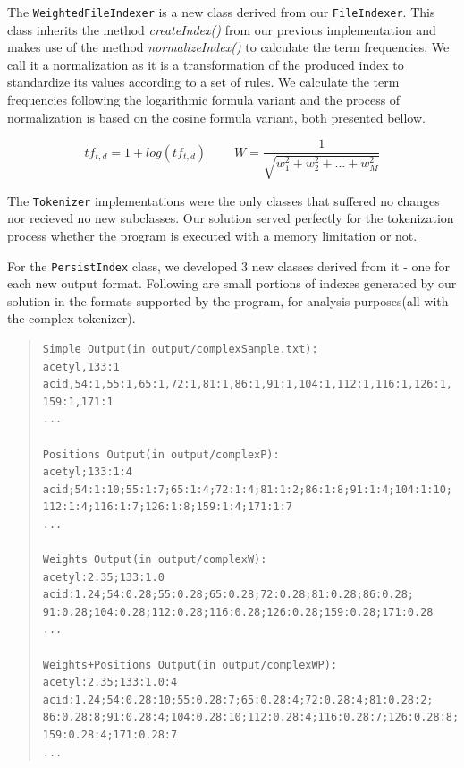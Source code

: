 \documentclass[12pt]{article}
\begin{document}
The \texttt{WeightedFileIndexer} is a new class derived from our 
\texttt{FileIndexer}.
This class inherits the method \textit{createIndex()} from our previous 
implementation and makes use of the method \textit{normalizeIndex()} to calculate 
the term frequencies. 
We call it a normalization as it is a transformation of the produced index to
standardize its values according to a set of rules.
We calculate the term frequencies following the logarithmic formula variant and 
the process of normalization is based on the cosine formula variant, both 
presented bellow.

\begin{equation*}
tf_{t,d} = 1 + log(tf_{t,d}) \>\>\>\>\>
\>\>\>\>\> W = \frac{1}{\sqrt{w_1^2 + w_2^2 + ... + w_M^2}}
\end{equation*}

The \texttt{Tokenizer} implementations were the only classes that suffered no
changes nor recieved no new subclasses. 
Our solution served perfectly for the tokenization process whether the program 
is executed with a memory limitation or not.

For the \texttt{PersistIndex} class, we developed 3 new classes derived from 
it - one for each new output format. 
Following are small portions of indexes generated by our solution in the formats
supported by the program, for analysis purposes(all with the complex tokenizer).

\begingroup
\addtolength\leftmargini{-0.4in}
\addtolength\baselineskip{-0.05in}
\begin{quote}
\begin{verbatim}
Simple Output(in output/complexSample.txt):
acetyl,133:1
acid,54:1,55:1,65:1,72:1,81:1,86:1,91:1,104:1,112:1,116:1,126:1,
159:1,171:1
...

Positions Output(in output/complexP):
acetyl;133:1:4
acid;54:1:10;55:1:7;65:1:4;72:1:4;81:1:2;86:1:8;91:1:4;104:1:10;
112:1:4;116:1:7;126:1:8;159:1:4;171:1:7
...

Weights Output(in output/complexW):
acetyl:2.35;133:1.0
acid:1.24;54:0.28;55:0.28;65:0.28;72:0.28;81:0.28;86:0.28;
91:0.28;104:0.28;112:0.28;116:0.28;126:0.28;159:0.28;171:0.28
...

Weights+Positions Output(in output/complexWP):
acetyl:2.35;133:1.0:4
acid:1.24;54:0.28:10;55:0.28:7;65:0.28:4;72:0.28:4;81:0.28:2;
86:0.28:8;91:0.28:4;104:0.28:10;112:0.28:4;116:0.28:7;126:0.28:8;
159:0.28:4;171:0.28:7
...
\end{verbatim}
\end{quote}
\endgroup
\end{document}
